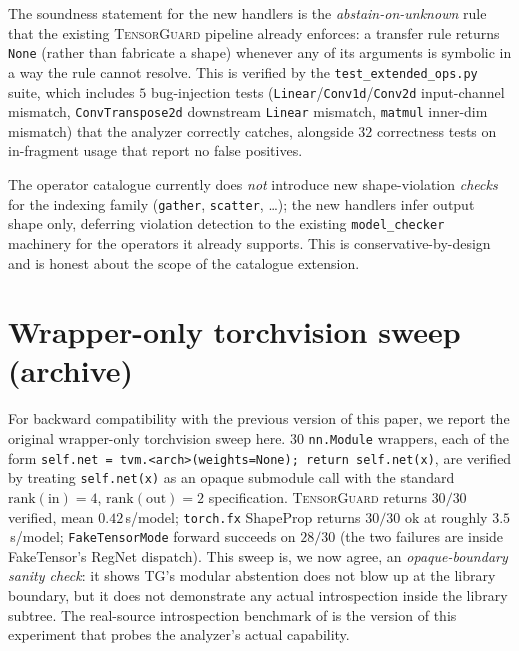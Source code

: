 \documentclass{article}
\theoremstyle{definition}
\begin{document}
The soundness statement for the new handlers is the
\emph{abstain-on-unknown} rule that the existing
\textsc{TensorGuard} pipeline already enforces: a transfer rule
returns \texttt{None} (rather than fabricate a shape) whenever any
of its arguments is symbolic in a way the rule cannot resolve.
This is verified by the \verb|test_extended_ops.py| suite, which
includes $5$ bug-injection tests
(\verb|Linear|/\verb|Conv1d|/\verb|Conv2d| input-channel
mismatch, \verb|ConvTranspose2d| downstream \verb|Linear|
mismatch, \verb|matmul| inner-dim mismatch) that the analyzer
correctly catches, alongside $32$ correctness tests on
in-fragment usage that report no false positives.

The operator catalogue currently does \emph{not} introduce new
shape-violation \emph{checks} for the indexing family
(\verb|gather|, \verb|scatter|, \dots); the new handlers infer
output shape only, deferring violation detection to the existing
\verb|model_checker| machinery for the operators it already
supports. This is conservative-by-design and is honest about the
scope of the catalogue extension.

\section{Wrapper-only torchvision sweep (archive)}
\label{app:tv-wrapper}
For backward compatibility with the previous version of this
paper, we report the original wrapper-only torchvision sweep here.
$30$ \verb|nn.Module| wrappers, each of the form
\verb|self.net = tvm.<arch>(weights=None); return self.net(x)|, are
verified by treating \verb|self.net(x)| as an opaque submodule call
with the standard $\textrm{rank}(\mathrm{in})=4$,
$\textrm{rank}(\mathrm{out})=2$ specification.
\textsc{TensorGuard} returns $30/30$ \textsf{verified}, mean
$0.42$\,s/model; \verb|torch.fx| ShapeProp returns $30/30$ ok at
roughly $3.5$\,s/model; \verb|FakeTensorMode| forward succeeds on
$28/30$ (the two failures are inside FakeTensor's RegNet dispatch).
This sweep is, we now agree, an \emph{opaque-boundary sanity
check}: it shows TG's modular abstention does not blow up at the
library boundary, but it does not demonstrate any actual
introspection inside the library subtree. The real-source
introspection benchmark of  is the version of
this experiment that probes the analyzer's actual capability.
\end{document}
